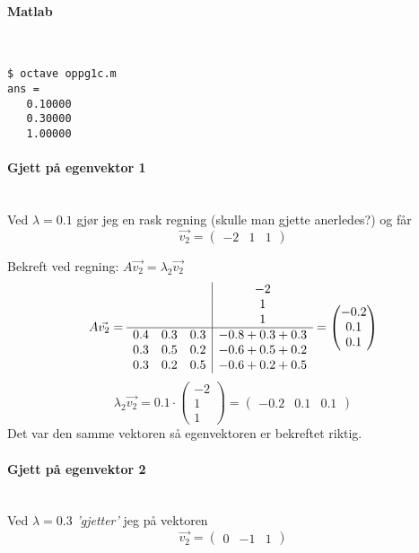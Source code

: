 \paragraph{Matlab} \mbox{} \\

\begin{lstlisting}
$ octave oppg1c.m
ans =
   0.10000
   0.30000
   1.00000
\end{lstlisting}



\paragraph{Gjett på egenvektor 1} \mbox{} \\
Ved $\lambda = 0.1$ gjør jeg en rask regning (skulle man gjette anerledes?)
og får $$\vec{v_2} = \begin{pmatrix} -2 & 1 & 1 \end{pmatrix}$$

Bekreft ved regning: $A\vec{v_2} = \lambda_2 \vec{v_2}$
$$A\vec{v_2} = \begin{array}{c c c|c}
                   & & & -2 \\
                   & & & 1 \\
                   & & & 1 \\
                  \hline
                  0.4 & 0.3 & 0.3 & -0.8 + 0.3 + 0.3 \\
                  0.3 & 0.5 & 0.2 & -0.6 + 0.5 + 0.2 \\
                  0.3 & 0.2 & 0.5 & -0.6 + 0.2 + 0.5
                  \end{array}
             = \begin{pmatrix} -0.2 \\ 0.1 \\ 0.1 \end{pmatrix}$$
$$\lambda_2\vec{v_2} = 0.1\cdot \begin{pmatrix} -2 \\ 1 \\ 1 \end{pmatrix}
                     = \begin{pmatrix} -0.2 & 0.1 & 0.1 \end{pmatrix}$$
Det var den samme vektoren så egenvektoren er bekreftet riktig.



\paragraph{Gjett på egenvektor 2} \mbox{} \\
Ved $\lambda = 0.3$ \emph{'gjetter'} jeg på vektoren
$$\vec{v_2} = \begin{pmatrix} 0 & -1 & 1 \end{pmatrix}$$

